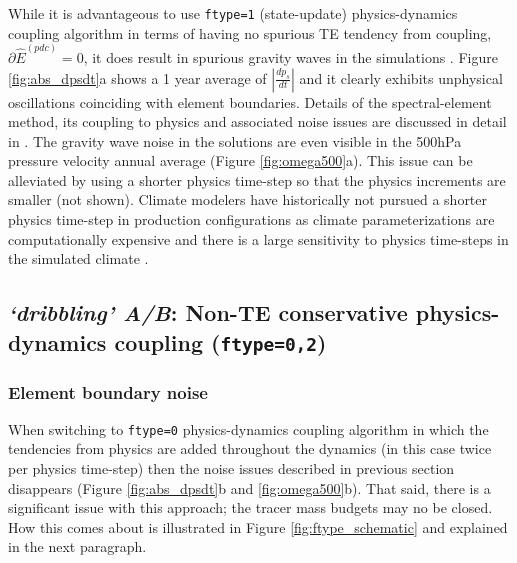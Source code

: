 \documentclass{agujournal}
\newcommand*{\gi}[1]{\widehat{#1}}
\begin{document}
While it is advantageous to use {\tt{ftype=1}} (state-update) physics-dynamics coupling algorithm in terms of having no spurious TE tendency from coupling, $\partial \gi{E}^{({pdc})}=0$, it does result in spurious gravity waves in the simulations \cite[see, e.g., Figure 5 in ][]{GetAl2018MWR}. Figure \ref{fig:abs_dpsdt}a shows a 1 year average of $|\frac{dp_s}{dt}|$ and it clearly exhibits unphysical oscillations coinciding with element boundaries. Details of the spectral-element method, its coupling to physics and associated noise issues are discussed in detail in \citet{HetAl2018MWR}. The gravity wave noise in the solutions are even visible in the 500hPa pressure velocity annual average (Figure \ref{fig:omega500}a). This issue can be alleviated by using a shorter physics time-step so that the physics increments are smaller (not shown). Climate modelers have historically not pursued a shorter physics time-step in production configurations as climate parameterizations are computationally expensive and there is a large sensitivity to physics time-steps in the simulated climate \citep[e.g.][]{WO2003QJR,WetAl2015JAMES}.

\subsection{{\em{`dribbling' A/B}}: Non-TE conservative physics-dynamics coupling ({\tt{ftype=0,2}})}\label{se:pdc_problem}
\subsubsection{Element boundary noise}\label{sec:noise}
When switching to {\tt{ftype=0}} physics-dynamics coupling algorithm in which the tendencies from physics are added throughout the dynamics (in this case twice per physics time-step) then the noise issues described in previous section disappears (Figure \ref{fig:abs_dpsdt}b and \ref{fig:omega500}b). That said, there is a significant issue with this approach; the tracer mass budgets may no be closed. How this comes about is illustrated in Figure \ref{fig:ftype_schematic} and explained in the next paragraph. 
\end{document}
